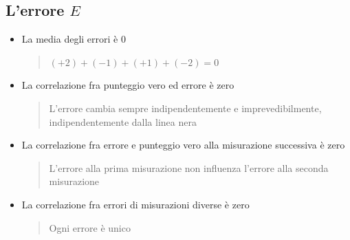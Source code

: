 \documentclass[compress]{beamer}
\begin{document}
\subsection*{L'errore $E$}

\vspace*{-5mm}
\begin{frame}

\small
\begin{itemize}
	\item La media degli errori è 0
	\begin{quote}
		\footnotesize
		$(+2) + (-1) + (+1) + (-2) = 0$
	\end{quote}
	\item 	La correlazione fra punteggio vero ed errore è zero
	\begin{quote}
			\footnotesize
L'errore cambia sempre indipendentemente e imprevedibilmente, indipendentemente dalla linea nera
	\end{quote}
	\item La correlazione fra errore e punteggio vero alla misurazione successiva è zero
	\begin{quote}
			\footnotesize
	L'errore alla prima misurazione non influenza l'errore alla seconda misurazione	
	\end{quote}
	\item La correlazione fra errori di misurazioni diverse è zero
	\begin{quote}
			\footnotesize
		Ogni errore è unico
	\end{quote}
\end{itemize}
\end{frame}
\end{document}
